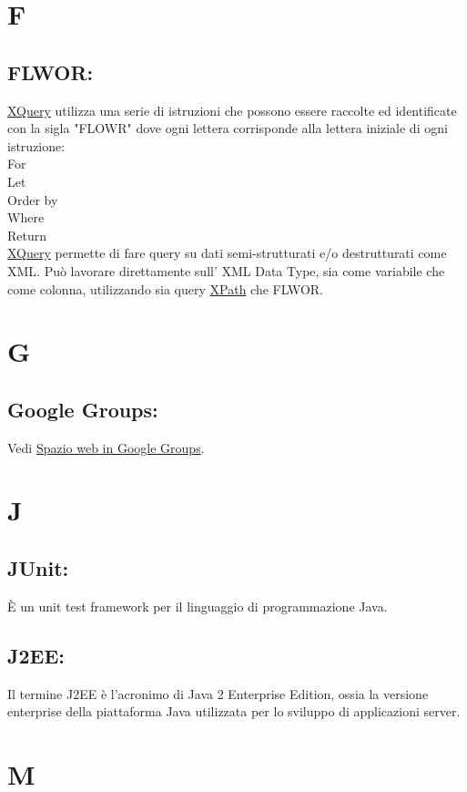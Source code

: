 \chapter{F}
\hypertarget{FLWOR}{}
\section{FLWOR:}
\hyperlink{XQuery}{XQuery} utilizza una serie di istruzioni che possono essere raccolte ed identificate con la sigla "FLOWR" dove ogni lettera corrisponde alla lettera iniziale di ogni istruzione:\\
For \\
Let \\
Order by \\
Where \\
Return \\
\hyperlink{XQuery}{XQuery} permette di fare query su dati semi-strutturati e/o destrutturati come XML. Pu\`o lavorare direttamente sull' XML Data Type, sia come variabile che come colonna, utilizzando sia query \hyperlink{XPath}{XPath} che FLWOR.

\chapter{G}
\hypertarget{Google Groups}{}
\section{Google Groups:}
Vedi \hyperlink{Spazio web in Google Groups}{Spazio web in Google Groups}.

\chapter{J}
\section{JUnit:}
\`E un unit test framework per il linguaggio di programmazione Java.

\hypertarget{J2EE}{}
\section{J2EE:}
Il termine J2EE \`e l'acronimo di Java 2 Enterprise Edition, ossia la versione enterprise della piattaforma Java utilizzata per lo sviluppo di applicazioni server.

\chapter{M}
